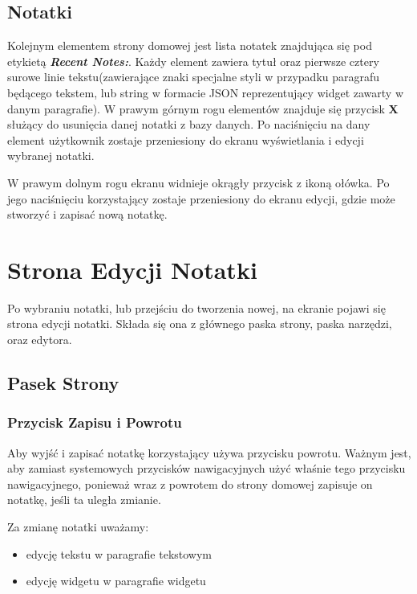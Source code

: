 \documentclass[shortabstract]{iithesis}
\begin{document}
\subsection{Notatki}

Kolejnym elementem strony domowej jest lista notatek znajdująca się pod etykietą \textbf{\textit{Recent Notes:}}. Każdy element zawiera tytuł oraz pierwsze cztery surowe linie tekstu(zawierające znaki specjalne styli w przypadku paragrafu będącego tekstem, lub string w formacie JSON reprezentujący widget zawarty w danym paragrafie).
W prawym górnym rogu elementów znajduje się przycisk \textbf{X} służący do usunięcia danej notatki z bazy danych.
Po naciśnięciu na dany element użytkownik zostaje przeniesiony do ekranu wyświetlania i edycji wybranej notatki.

W prawym dolnym rogu ekranu widnieje okrągły przycisk z ikoną ołówka.
Po jego naciśnięciu korzystający zostaje przeniesiony do ekranu edycji, gdzie może stworzyć i zapisać nową notatkę.

\section{Strona Edycji Notatki}

Po wybraniu notatki, lub przejściu do tworzenia nowej, na ekranie pojawi się strona edycji notatki. Składa się ona z głównego paska strony, paska narzędzi, oraz edytora.

\subsection{Pasek Strony}

\subsubsection{Przycisk Zapisu i Powrotu}

Aby wyjść i zapisać notatkę korzystający używa przycisku powrotu.
Ważnym jest, aby zamiast systemowych przycisków nawigacyjnych użyć właśnie tego przycisku nawigacyjnego, ponieważ wraz z powrotem do strony domowej zapisuje on notatkę, jeśli ta uległa zmianie.

Za zmianę notatki uważamy:

\begin{itemize}
    \item edycję tekstu w paragrafie tekstowym
    \item edycję widgetu w paragrafie widgetu
\end{itemize}
\end{document}
